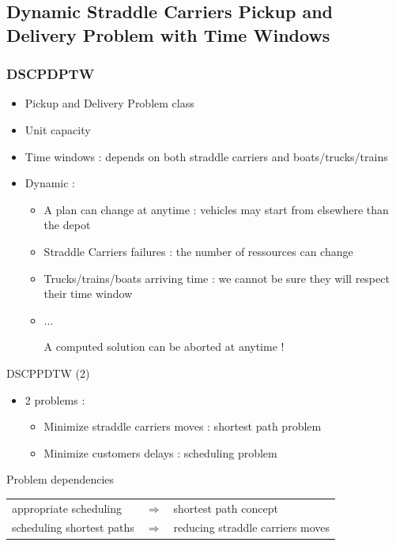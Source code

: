 \documentclass{beamer}
\begin{document}
\subsection*{Dynamic Straddle Carriers Pickup and Delivery Problem with Time Windows}
\begin{frame}
\frametitle{DSCPDPTW}
	\begin{itemize}
 		\item Pickup and Delivery Problem class
		\item Unit capacity
		\item Time windows : depends on both straddle carriers and boats/trucks/trains
		\item Dynamic : 
			   \begin{itemize}
			    \item A plan can change at anytime : vehicles may start from elsewhere than the depot
			    \item Straddle Carriers failures : the number of ressources can change
			    \item Trucks/trains/boats arriving time : we cannot be sure they will respect their time window
			    \item ...
			    \begin{center}  A computed solution can be aborted at anytime ! \end{center}
			    \end{itemize}
	\end{itemize}
\end{frame}
\begin{frame}{DSCPPDTW (2)}
	\begin{itemize}
	 \item 2 problems : 
		\begin{itemize}
 			\item Minimize straddle carriers moves : shortest path problem
			\item Minimize customers delays : scheduling problem
		\end{itemize}
	\end{itemize}
	
	
	\begin{alertblock}{Problem dependencies}
		\begin{tabular}{*{3}{l}}
			appropriate scheduling & $\Rightarrow$ & shortest path concept\\
			scheduling shortest paths & $\Rightarrow$ & reducing straddle carriers moves
		\end{tabular}
	\end{alertblock}	
\end{frame}
\end{document}
